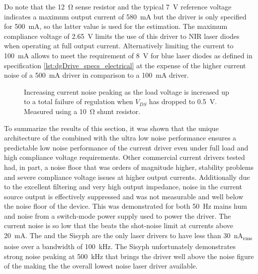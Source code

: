 Do note that the \qty{12}{\ohm} sense resistor and the typical \qty{7}{\V} reference voltage indicates a maximum output current of \qty{580}{\mA} but the driver is only specified for \qty{500}{\mA}, so the latter value is used for the estimation. The maximum compliance voltage of \qty{2.65}{\V} limits the use of this driver to NIR laser diodes when operating at full output current. Alternatively limiting the current to \qty{100}{\mA} allows to meet the requirement of \qty{8}{\V} for blue laser diodes as defined in specification \ref{lst:dgDrive_specs_electrical} at the expense of the higher current noise of a \qty{500}{\mA} driver in comparison to a \qty{100}{\mA} driver.
\begin{figure}[ht]
    \centering
    
    \caption{Increasing current noise peaking as the load voltage is increased up to a total failure of regulation when $V_{DS}$ has dropped to \qty{0.5}{\V}. Measured using a \qty{10}{\ohm} shunt resistor.}
    \label{fig:vescent_gain_peaking}
\end{figure}

To summarize the results of this section, it was shown that the unique architecture of the  combined with the ultra low noise performance ensures a predictable low noise performance of the current driver even under full load and high compliance voltage requirements. Other commercial current drivers tested had, in part, a noise floor that was orders of magnitude higher, stability problems and severe compliance voltage issues at higher output currents. Additionally due to the excellent filtering and very high output impedance, noise in the current source output is effectively suppressed and was not measurable and well below the noise floor of the device. This was demonstrated for both \qty{50}{\Hz} mains hum and noise from a switch-mode power supply used to power the driver. The current noise is so low that the  beats the shot-noise limit at currents above \qty{20}{\mA}. The  and the Sisyph  are the only laser drivers to have less than \qty{30}{\nA_{rms}} noise over a bandwidth of \qty{100}{\kHz}. The Sisyph  unfortunately demonstrates strong noise peaking at \qty{500}{kHz} that brings the driver well above the noise figure of the  making the  the overall lowest noise laser driver available.

